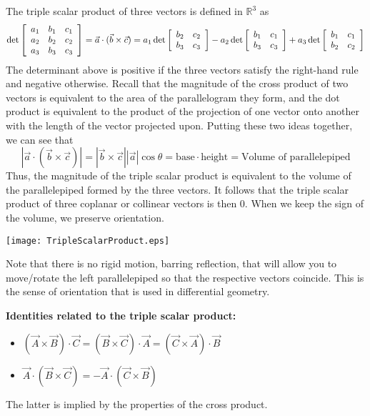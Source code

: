 \documentclass{article}
\begin{document}

The triple scalar product of three vectors is defined in $\mathbb{R}^3$ as
$$\det\left[\begin{array}{ccc}a_1&b_1&c_1\\a_2&b_2&c_2\\a_3&b_3&c_3\end{array}\right]=\vec{a}\cdot(\vec{b}\times\vec{c})\\=a_1\det\left[\begin{array}{cc}b_2 & c_2\\ b_3 & c_3\end{array}\right] - a_2\det\left[\begin{array}{cc}b_1 & c_1\\ b_3 & c_3\end{array}\right] + a_3\det\left[\begin{array}{cc}b_1 & c_1\\ b_2 & c_2\end{array}\right]$$
The determinant above is positive if the three vectors satisfy the right-hand rule and negative otherwise. Recall that the magnitude of the cross product of two vectors is equivalent to the area of the parallelogram they form, and the dot product is equivalent to the product of the projection of one vector onto another with the length of the vector projected upon. Putting these two ideas together, we can see that 
$$|\vec{a}\cdot(\vec{b}\times\vec{c})|=|\vec{b}\times\vec{c}||\vec{a}|\cos\theta=\text{base}\cdot\text{height}=\text{Volume of parallelepiped}$$
Thus, the magnitude of the triple scalar product is equivalent to the volume of the parallelepiped formed by the three vectors. It follows that the triple scalar product of three coplanar or collinear vectors is then 0. When we keep the sign of the volume, we preserve orientation.
\begin{center}
\texttt{[image: TripleScalarProduct.eps]}\\
\end{center}
Note that there is no rigid motion, barring reflection, that will allow you to move/rotate the left parallelepiped so that the respective vectors coincide. This is the sense of orientation that is used in differential geometry.

\textbf{Identities related to the triple scalar product:}\\

\begin{itemize}
\item $(\vec{A}\times\vec{B})\cdot\vec{C}=(\vec{B}\times\vec{C})\cdot\vec{A}=(\vec{C}\times\vec{A})\cdot\vec{B}$\\
\item $\vec{A}\cdot(\vec{B}\times\vec{C})=-\vec{A}\cdot(\vec{C}\times\vec{B})$\\
\end{itemize}
The latter is implied by the properties of the cross product.
\end{document}
